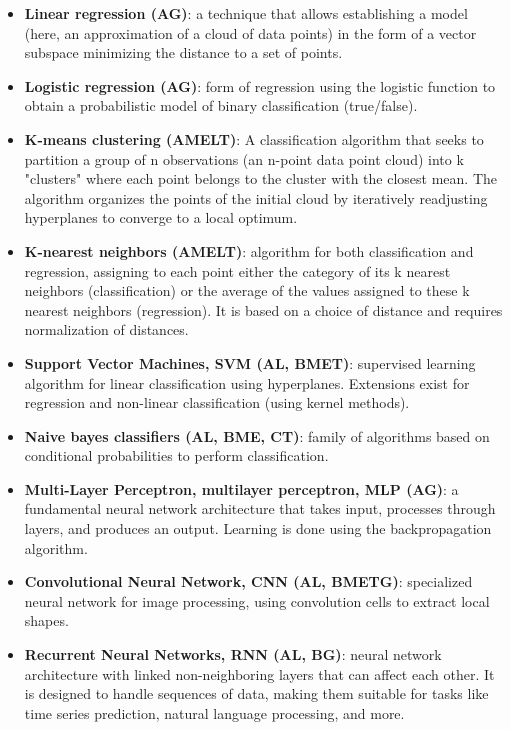 \documentclass{article}
\begin{document}
\begin{itemize}

	\item \textbf{Linear regression (AG)}: a technique that allows establishing a model (here, an approximation of a cloud of data points) in the form of a vector subspace minimizing the distance to a set of points.

	\item \textbf{Logistic regression (AG)}: form of regression using the logistic function to obtain a probabilistic model of binary classification (true/false).

	\item \textbf{K-means clustering (AMELT)}: A classification algorithm that seeks to partition a group of n observations (an n-point data point cloud) into k "clusters" where each point belongs to the cluster with the closest mean. The algorithm organizes the points of the initial cloud by iteratively readjusting hyperplanes to converge to a local optimum.

	\item \textbf{K-nearest neighbors (AMELT)}: algorithm for both classification and regression, assigning to each point either the category of its k nearest neighbors (classification) or the average of the values assigned to these k nearest neighbors (regression). It is based on a choice of distance and requires normalization of distances.

	\item \textbf{Support Vector Machines, SVM (AL, BMET)}: supervised learning algorithm for linear classification using hyperplanes. Extensions exist for regression and non-linear classification (using kernel methods).

	\item \textbf{Naive bayes classifiers (AL, BME, CT)}: family of algorithms based on conditional probabilities to perform classification.

	\item \textbf{Multi-Layer Perceptron, multilayer perceptron, MLP (AG)}: a fundamental neural network architecture that takes input, processes through layers, and produces an output. Learning is done using the backpropagation algorithm.

	\item \textbf{Convolutional Neural Network, CNN (AL, BMETG)}: specialized neural network for image processing, using convolution cells to extract local shapes.

	\item \textbf{Recurrent Neural Networks, RNN (AL, BG)}: neural network architecture with linked non-neighboring layers that can affect each other. It is designed to handle sequences of data, making them suitable for tasks like time series prediction, natural language processing, and more.


\end{itemize}
\end{document}
